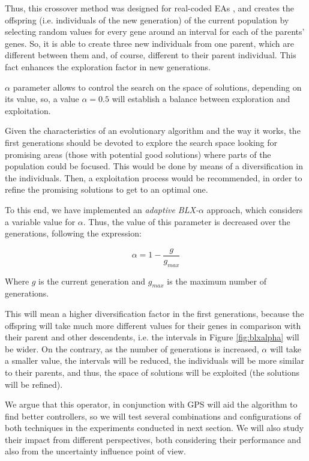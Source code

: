 \documentclass[10pt,journal,compsoc]{IEEEtran}
\begin{document}
Thus, this crossover method was designed for real-coded EAs \cite{blx2008}, and creates the offspring (i.e. individuals of the new generation) of the current population by selecting random values for every gene around an interval for each of the parents' genes. So, it is able to create three new individuals from one parent, which are different between them and, of course, different to their parent individual. This fact enhances the exploration factor in new generations.

$\alpha$ parameter allows to control the search on the space of solutions, depending on its value, so, a value $\alpha = 0.5$ will establish a balance between exploration and exploitation.

Given the characteristics of an evolutionary algorithm and the way it works, the first generations should be devoted to explore the search space looking for promising areas (those with potential good solutions) where parts of the population could be focused. This would be done by means of a diversification in the individuals. Then, a exploitation process would be recommended, in order to refine the promising solutions to get to an optimal one.

To this end, we have implemented an \textit{adaptive BLX-$\alpha$} approach, which considers a variable value for $\alpha$. Thus, the value of this parameter is decreased over the generations, following the expression:

 \begin{equation}
 	\label{eqalpha}
 	\alpha =1-\frac{g}{g_{max}}
 \end{equation}

Where $g$ is the current generation and $g_{max}$ is the maximum number of generations. 

This will mean a higher diversification factor in the first generations, because the offspring will take much more different values for their genes in comparison with their parent and other descendents, i.e. the intervals in Figure \ref{fig:blxalpha} will be wider. On the contrary, as the number of generations is increased, $\alpha$ will take a smaller value, the intervals will be reduced, the individuals will be more similar to their parents, and thus, the space of solutions will be exploited (the solutions will be refined).

We argue that this operator, in conjunction with GPS will aid the algorithm to find better controllers, so we will test several combinations and configurations of both techniques in the experiments conducted in next section. We will also study their impact from different perspectives, both considering their performance and also from the uncertainty influence point of view.
\end{document}
